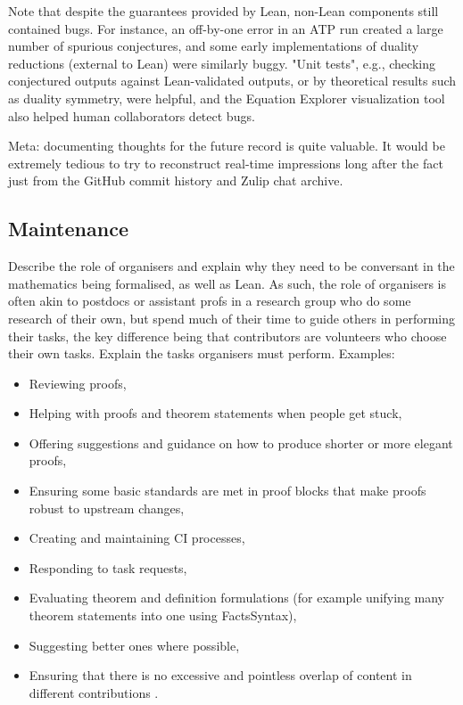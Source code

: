 Note that despite the guarantees provided by Lean, non-Lean components still contained bugs. For instance, an off-by-one error in an ATP run created a large number of spurious conjectures, and some early implementations of duality reductions (external to Lean) were similarly buggy. "Unit tests", e.g., checking conjectured outputs against Lean-validated outputs, or by theoretical results such as duality symmetry, were helpful, and the Equation Explorer visualization tool also helped human collaborators detect bugs.

Meta: documenting thoughts for the future record is quite valuable. It would be extremely tedious to try to reconstruct real-time impressions long after the fact just from the GitHub commit history and Zulip chat archive.

\subsection{Maintenance}

Describe the role of organisers and explain why they need to be conversant in the mathematics being formalised, as well as Lean. As such, the role of organisers is often akin to postdocs or assistant profs in a research group who do some research of their own, but spend much of their time to guide others in performing their tasks, the key difference being that contributors are volunteers who choose their own tasks. Explain the tasks organisers must perform. Examples:

\begin{itemize}
    \item Reviewing proofs,
    \item Helping with proofs and theorem statements when people get stuck,
    \item Offering suggestions and guidance on how to produce shorter or more elegant proofs,
    \item Ensuring some basic standards are met in proof blocks that make proofs robust to upstream changes,
    \item Creating and maintaining CI processes,
    \item Responding to task requests,
    \item Evaluating theorem and definition formulations (for example unifying many theorem statements into one using FactsSyntax),
    \item Suggesting better ones where possible,
    \item Ensuring that there is no excessive and pointless overlap of content in different contributions .
\end{itemize}
